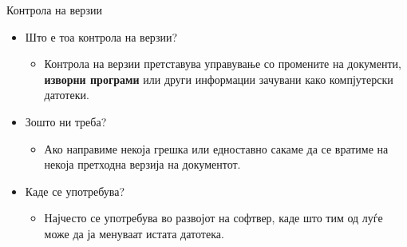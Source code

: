 \begin{frame}{Контрола на верзии}
\begin{itemize}
\item Што е тоа контрола на верзии?
    \begin{itemize}
    \item Контрола на верзии претставува управување со промените на документи,
    \textbf{изворни програми} или други информации зачувани како компјутерски датотеки.
    \end{itemize}
\pause
\item Зошто ни треба?
    \begin{itemize}
    \item Ако направиме некоја грешка или едноставно сакаме да се
    вратиме на некоја претходна верзија на документот.
    \end{itemize}
\pause
\item Каде се употребува?
    \begin{itemize}
    \item Најчесто се употребува во развојот на софтвер, каде што тим од луѓе може да ја менуваат истата датотека.
    \end{itemize}
\end{itemize}
\end{frame}

